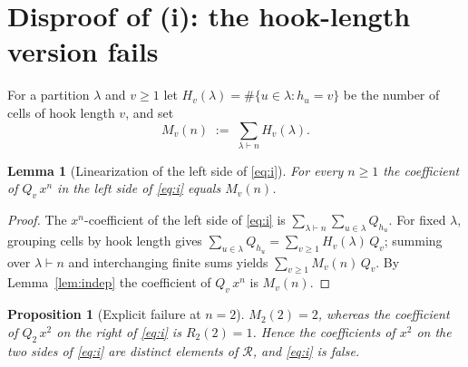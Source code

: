 \documentclass[12pt]{article}
\newtheorem{lemma}{Lemma}
\newtheorem{proposition}{Proposition}
\theoremstyle{definition}
\begin{document}
\section{Disproof of (i): the hook-length version fails}

For a partition $\lambda$ and $v\ge1$ let $H_v(\lambda)=\#\{u\in\lambda:h_u=v\}$ be
the number of cells of hook length $v$, and set
\begin{equation}\label{eq:Mv}
M_v(n)\;:=\;\sum_{\lambda\vdash n}H_v(\lambda).
\end{equation}

\begin{lemma}[Linearization of the left side of \eqref{eq:i}]\label{lem:linI}
For every $n\ge1$ the coefficient of $Q_v\,x^n$ in the left side of \eqref{eq:i}
equals $M_v(n)$.
\end{lemma}

\begin{proof}
The $x^n$-coefficient of the left side of \eqref{eq:i} is
$\sum_{\lambda\vdash n}\sum_{u\in\lambda}Q_{h_u}$. For fixed $\lambda$, grouping
cells by hook length gives $\sum_{u\in\lambda}Q_{h_u}=\sum_{v\ge1}H_v(\lambda)\,Q_v$;
summing over $\lambda\vdash n$ and interchanging finite sums yields
$\sum_{v\ge1}M_v(n)\,Q_v$. By Lemma~\ref{lem:indep} the coefficient of $Q_v\,x^n$ is
$M_v(n)$.
\end{proof}

\begin{proposition}[Explicit failure at $n=2$]\label{prop:counter}
$M_2(2)=2$, whereas the coefficient of $Q_2\,x^2$ on the right of \eqref{eq:i} is
$R_2(2)=1$. Hence the coefficients of $x^2$ on the two sides of \eqref{eq:i} are
distinct elements of $\mathcal R$, and \eqref{eq:i} is false.
\end{proposition}
\end{document}
